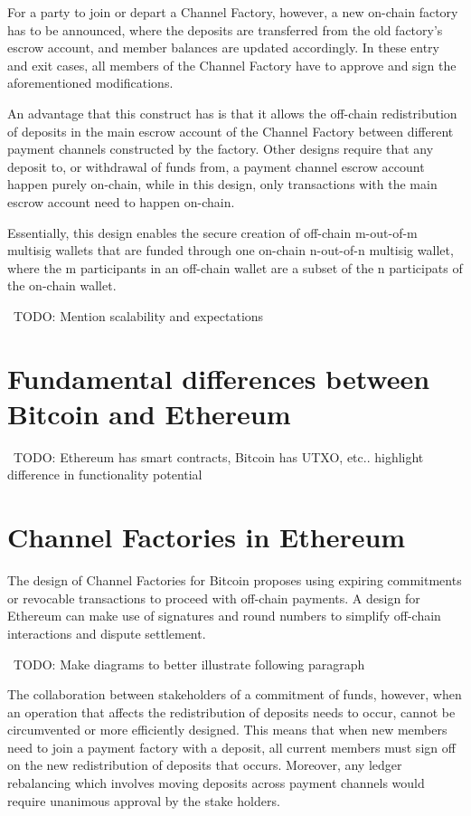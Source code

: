 \documentclass[12pt]{article}
\newcommand{\todo}[1]{{\color{red}\ TODO: {#1}}}
\begin{document}
For a party to join or depart a Channel Factory, however, a new on-chain factory has to be announced, where the deposits are transferred from the old factory's escrow account, and member balances are updated accordingly. In these entry and exit cases, all members of the Channel Factory have to approve and sign the aforementioned modifications.

An advantage that this construct has is that it allows the off-chain redistribution of deposits in the main escrow account of the Channel Factory between different payment channels constructed by the factory. Other designs require that any deposit to, or withdrawal of funds from, a payment channel escrow account happen purely on-chain, while in this design, only transactions with the main escrow account need to happen on-chain.

Essentially, this design enables the secure creation of off-chain m-out-of-m multisig wallets that are funded through one on-chain n-out-of-n multisig wallet, where the m participants in an off-chain wallet are a subset of the n participats of the on-chain wallet.

\todo{Mention scalability and expectations}

\section{Fundamental differences between Bitcoin and Ethereum}
\todo{Ethereum has smart contracts, Bitcoin has UTXO, etc.. highlight difference in functionality potential}

\section{Channel Factories in Ethereum}

The design of Channel Factories for Bitcoin proposes using expiring commitments or revocable transactions to proceed with off-chain payments. A design for Ethereum can make use of signatures and round numbers to simplify off-chain interactions and dispute settlement.

\todo{Make diagrams to better illustrate following paragraph}

The collaboration between stakeholders of a commitment of funds, however, when an operation that affects the redistribution of deposits needs to occur, cannot be circumvented or more efficiently designed. This means that when new members need to join a payment factory with a deposit, all current members must sign off on the new redistribution of deposits that occurs. Moreover, any ledger rebalancing which involves moving deposits across payment channels would require unanimous approval by the stake holders.
\end{document}
